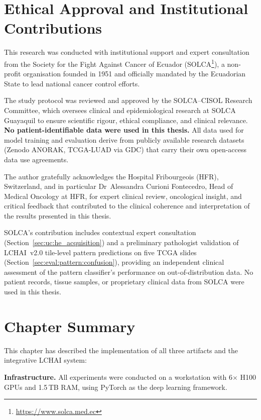 \section{Ethical Approval and Institutional Contributions}
\label{sec:impl:ethical}
 
This research was conducted with institutional support and expert
consultation from the Society for the Fight Against Cancer of Ecuador
(SOLCA\footnote{\url{https://www.solca.med.ec}}), a non-profit
organisation founded in 1951 and officially mandated by the Ecuadorian
State to lead national cancer control efforts.
 
The study protocol was reviewed and approved by the SOLCA--CISOL
Research Committee, which oversees clinical and epidemiological research
at SOLCA Guayaquil to ensure scientific rigour, ethical compliance, and
clinical relevance.
\textbf{No patient-identifiable data were used in this thesis.}
All data used for model training and evaluation derive from publicly
available research datasets (Zenodo ANORAK, TCGA-LUAD via GDC) that
carry their own open-access data use agreements.
 
The author gratefully acknowledges the Hospital Fribourgeois (HFR),
Switzerland, and in particular Dr~Alessandra Curioni Fontecedro, Head
of Medical Oncology at HFR, for expert clinical review, oncological
insight, and critical feedback that contributed to the clinical
coherence and interpretation of the results presented in this thesis.
 
SOLCA's contribution includes contextual expert consultation
(Section~\ref{sec:uc:he_acquisition}) and a preliminary pathologist
validation of LCHAI~v2.0 tile-level pattern predictions on five TCGA
slides (Section~\ref{sec:eval:pattern:confusion}), providing an
independent clinical assessment of the pattern classifier's
performance on out-of-distribution data.
No patient records, tissue samples, or proprietary clinical data from
SOLCA were used in this thesis.

\section{Chapter Summary}
\label{sec:impl:summary}

This chapter has described the implementation of all three artifacts and
the integrative LCHAI system:

\textbf{Infrastructure.}
All experiments were conducted on a workstation with 6$\times$ H100 GPUs
and 1.5\,TB RAM, using PyTorch as the deep learning framework.

